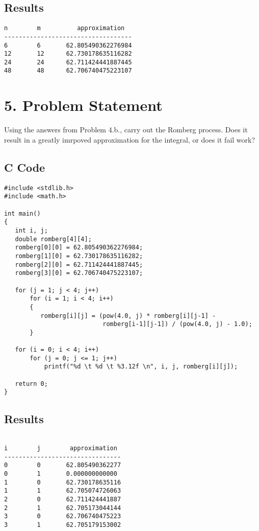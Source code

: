 \documentclass{article}
\begin{document}
\subsection*{Results}

\begin{verbatim}
n        m          approximation
-----------------------------------
6        6       62.805490362276984 
12       12      62.730178635116282 
24       24      62.711424441887445 
48       48      62.706740475223107 
\end{verbatim}



\section*{5.   Problem Statement}
Using the answers from Problem 4.b., carry out the Romberg process.  Does it 
result in a greatly imrpoved approximation for the integral, or does it fail 
work?

\subsection*{C Code}
\begin{verbatim}
#include <stdlib.h>
#include <math.h>

int main()
{	
   int i, j;
   double romberg[4][4];
   romberg[0][0] = 62.805490362276984; 
   romberg[1][0] = 62.730178635116282;
   romberg[2][0] = 62.711424441887445; 
   romberg[3][0] = 62.706740475223107;

   for (j = 1; j < 4; j++)
       for (i = 1; i < 4; i++)
       {
          romberg[i][j] = (pow(4.0, j) * romberg[i][j-1] - 
                           romberg[i-1][j-1]) / (pow(4.0, j) - 1.0);
       }
   
   for (i = 0; i < 4; i++)
       for (j = 0; j <= 1; j++)
           printf("%d \t %d \t %3.12f \n", i, j, romberg[i][j]);
   
   return 0;
}
\end{verbatim}

\subsection*{Results}

\begin{verbatim}

i        j        approximation
--------------------------------
0        0       62.805490362277 
0        1       0.000000000000 
1        0       62.730178635116 
1        1       62.705074726063 
2        0       62.711424441887 
2        1       62.705173044144 
3        0       62.706740475223 
3        1       62.705179153002 
\end{verbatim}
\end{document}
